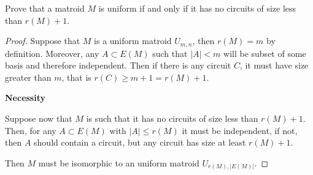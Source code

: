 \prob
{
    Prove that a matroid $M$ is uniform if and only if it has no circuits of 
    size less than $r(M) + 1$.
}
\begin{proof}
	Suppose that $M$ is a uniform matroid $U_{m, n}$, then $r(M) = m$ by definition.
    Moreover, any $A \subset E(M)$ such that $|A| < m$ will be subset of some basis and
    therefore independent. Then if there is any circuit $C$, it must have size greater
    than $m$, that is $r(C) \geq m + 1 = r(M) + 1$.\pn

    \textbf{Necessity}\pn
    
    Suppose now that $M$ is such that it has no circuits of size less than $r(M) + 1$.
    Then, for any $A \subset E(M)$ with $|A| \leq r(M)$ it must be independent, if not,
    then $A$ should contain a circuit, but any circuit has size at least $r(M) + 1$.\pn
    
    Then $M$ must be isomorphic to an uniform matroid $U_{r(M), |E(M)|}$.
\end{proof}
